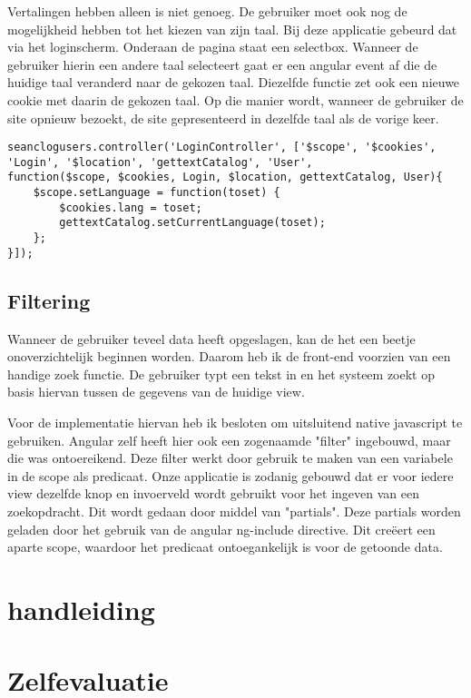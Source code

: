 \documentclass[a4paper,11pt]{article}
\begin{document}
Vertalingen hebben alleen is niet genoeg. De gebruiker moet ook nog de mogelijkheid hebben tot het kiezen van zijn taal. Bij deze applicatie gebeurd dat via het loginscherm. Onderaan de pagina staat een selectbox. Wanneer de gebruiker hierin een andere taal selecteert gaat er een angular event af die de huidige taal veranderd naar de gekozen taal. Diezelfde functie zet ook een nieuwe cookie met daarin de gekozen taal. Op die manier wordt, wanneer de gebruiker de site opnieuw bezoekt, de site gepresenteerd in dezelfde taal als de vorige keer.

\begin{lstlisting}
seanclogusers.controller('LoginController', ['$scope', '$cookies', 'Login', '$location', 'gettextCatalog', 'User',
function($scope, $cookies, Login, $location, gettextCatalog, User){	
	$scope.setLanguage = function(toset) {
		$cookies.lang = toset;
		gettextCatalog.setCurrentLanguage(toset);
	};
}]);
\end{lstlisting}

\subsection{Filtering}
Wanneer de gebruiker teveel data heeft opgeslagen, kan de het een beetje onoverzichtelijk beginnen worden. Daarom heb ik de front-end voorzien van een handige zoek functie. De gebruiker typt een tekst in en het systeem zoekt op basis hiervan tussen de gegevens van de huidige view.

Voor de implementatie hiervan heb ik besloten om uitsluitend native javascript te gebruiken. Angular zelf heeft hier ook een zogenaamde "filter" ingebouwd, maar die was ontoereikend. Deze filter werkt door gebruik te maken van een variabele in de scope als predicaat. Onze applicatie is zodanig gebouwd dat er voor iedere view dezelfde knop en invoerveld wordt gebruikt voor het ingeven van een zoekopdracht. Dit wordt gedaan door middel van "partials". Deze partials worden geladen door het gebruik van de angular ng-include directive. Dit creëert een aparte scope, waardoor het predicaat ontoegankelijk is voor de getoonde data.


\section{handleiding}

\section{Zelfevaluatie}



\end{document}
